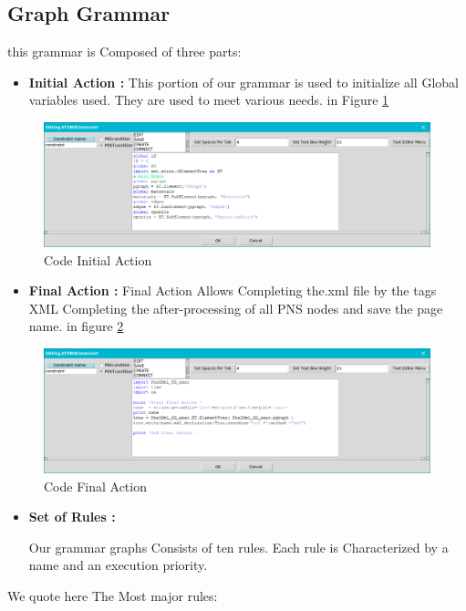 \subsection{ Graph Grammar }
 this grammar is Composed of three parts: 
\begin{itemize}
\item \textbf{Initial Action : } This portion of our grammar is used to initialize all
Global variables used. They are used to meet various needs.  in Figure \ref{fig:Code Initial Action} 

\end{itemize}

\begin{figure}[th]
	\centering  %
 	\includegraphics[scale=0.38]{ch3/img/InitAct}
	\caption{\label{fig:Code Initial Action}Code Initial Action}
\end{figure} 

\begin{itemize}
\item \textbf{Final Action : } Final Action Allows Completing the.xml file by the tags
XML Completing the after-processing of all PNS nodes and save the page name. in figure \ref{fig:Code Final Action} 
   
\end{itemize}

\begin{figure}[th]
	\centering  %
 	\includegraphics[scale=0.38]{ch3/img/FinAct}
	\caption{\label{fig:Code Final Action}Code Final Action}
\end{figure} 
\pagebreak
\begin{itemize}
\item \textbf{ Set of Rules : } 
 
Our grammar graphs Consists of ten rules. Each
rule is Characterized by a name and an execution priority. 

\end{itemize}
 We quote here The Most major rules: 

